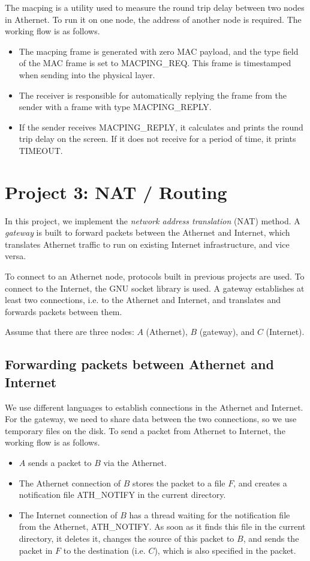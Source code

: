 \documentclass[11pt, conference]{IEEEtran}
\begin{document}
The \textsf{macping} is a utility used to measure the round trip delay between two nodes in Athernet. To run it on one node, the address of another node is required. The working flow is as follows.
\begin{itemize}
\item The \textsf{macping} frame is generated with zero MAC payload, and the type field of the MAC frame is set to \textsf{MACPING\_REQ}. This frame is timestamped when sending into the physical layer.
\item The receiver is responsible for automatically replying the frame from the sender with a frame with type \textsf{MACPING\_REPLY}.
\item If the sender receives \textsf{MACPING\_REPLY}, it calculates and prints the round trip delay on the screen. If it does not receive for a period of time, it prints \textsf{TIMEOUT}.
\end{itemize}

\section{Project 3: NAT / Routing}

In this project, we implement the \emph{network address translation} (NAT) method. A \emph{gateway} is built to forward packets between the Athernet and Internet, which translates Athernet traffic to run on existing Internet infrastructure, and vice versa.

To connect to an Athernet node, protocols built in previous projects are used. To connect to the Internet, the GNU socket library is used. A gateway establishes at least two connections, i.e. to the Athernet and Internet, and translates and forwards packets between them.

Assume that there are three nodes: $A$ (Athernet), $B$ (gateway), and $C$ (Internet).

\subsection{Forwarding packets between Athernet and Internet}

We use different languages to establish connections in the Athernet and Internet. For the gateway, we need to share data between the two connections, so we use temporary files on the disk. To send a packet from Athernet to Internet, the working flow is as follows.
\begin{itemize}
\item $A$ sends a packet to $B$ via the Athernet.
\item The Athernet connection of $B$ stores the packet to a file $F$, and creates a notification file \textsf{ATH\_NOTIFY} in the current directory.
\item The Internet connection of $B$ has a thread waiting for the notification file from the Athernet, \textsf{ATH\_NOTIFY}. As soon as it finds this file in the current directory, it deletes it, changes the source of this packet to $B$, and sends the packet in $F$ to the destination (i.e. $C$), which is also specified in the packet.
\end{itemize}
\end{document}
